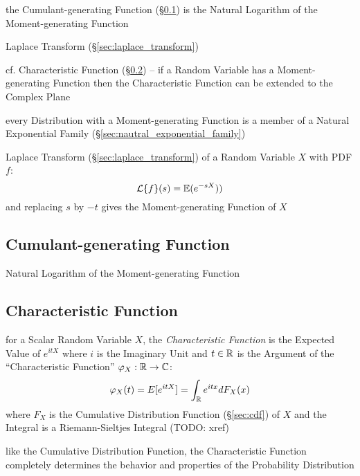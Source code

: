 the Cumulant-generating Function (\S\ref{sec:cumulant_generating_function}) is
the Natural Logarithm of the Moment-generating Function

\fist Laplace Transform (\S\ref{sec:laplace_transform})

cf. Characteristic Function (\S\ref{sec:characteristic_function}) --
if a Random Variable has a Moment-generating Function then the Characteristic
Function can be extended to the Complex Plane

every Distribution with a Moment-generating Function is a member of a Natural
Exponential Family (\S\ref{sec:nautral_exponential_family})

Laplace Transform (\S\ref{sec:laplace_transform}) of a Random Variable $X$ with
PDF $f$:
\[
  \mathcal{L}\{f\}(s) = \mathbb{E}(e^{-sX}))
\]
and replacing $s$ by $-t$ gives the Moment-generating Function of $X$



\subsection{Cumulant-generating Function}
\label{sec:cumulant_generating_function}

Natural Logarithm of the Moment-generating Function



\subsection{Characteristic Function}\label{sec:characteristic_function}

for a Scalar Random Variable $X$, the \emph{Characteristic Function} is the
Expected Value of $e^{itX}$ where $i$ is the Imaginary Unit and $t \in \mathbb{R}$
is the Argument of the ``Characteristic Function''
$\varphi_X : \mathbb{R} \to \mathbb{C}$:
\[
  \varphi_X(t) = E[e^{itX}] = \int_{\mathbb{R}} e^{itx} dF_X(x)
\]
where $F_X$ is the Cumulative Distribution Function (\S\ref{sec:cdf}) of $X$ and
the Integral is a Riemann-Sieltjes Integral (TODO: xref)

like the Cumulative Distribution Function, the Characteristic Function
completely determines the behavior and properties of the Probability
Distribution

